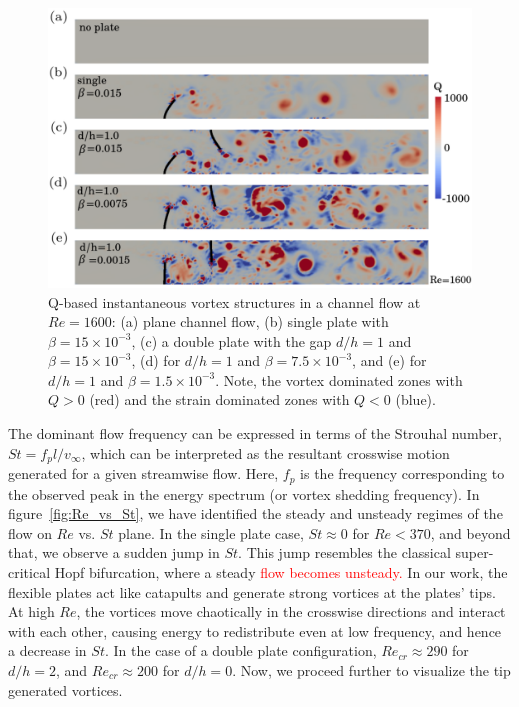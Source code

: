 \documentclass[aps,pre,twocolumn,aps,longbibliography]{revtex4-1}
\begin{document}
	\begin{figure}[b]
		\begin{minipage}[c]{1\linewidth}
			\includegraphics[width=1\linewidth]{Fig14.pdf} 
		\end{minipage} 
		\caption{Q-based instantaneous vortex structures in a channel flow at $Re=1600$: (a) plane channel flow, (b) single plate with $\beta=15\times10^{-3}$, (c) a double plate with the gap $d/h=1$ and $\beta=15\times10^{-3}$, (d) for $d/h=1$ and $\beta=7.5\times10^{-3}$, and (e) for $d/h=1$ and $\beta=1.5\times10^{-3}$. Note, the vortex dominated zones with $Q>0$ (red) and the strain dominated zones with $Q<0$ (blue). }
		\label{fig:Re1600_Qvort}
	\end{figure}
	
	
	The dominant flow frequency can be expressed in terms of the Strouhal number, $St=f_p l/v_{\infty}$, which can be interpreted as the resultant crosswise motion generated for a given streamwise flow. Here, $f_p$ is the frequency corresponding to the observed peak in the energy spectrum (or vortex shedding frequency). In figure~\ref{fig:Re_vs_St}, we have identified the steady and unsteady regimes of the flow on $Re$ vs. $St$ plane. In the single plate case, $St\approx 0$ for $Re<370$, and beyond that, we observe a sudden jump in $St$. This jump resembles the classical super-critical Hopf bifurcation, where a steady \textcolor{red}{flow becomes unsteady.} In our work, the flexible plates act like catapults and generate strong vortices at the plates' tips. At high $Re$, the vortices move chaotically in the crosswise directions and interact with each other, causing energy to redistribute even at low frequency, and hence a decrease in $St$. In the case of a double plate configuration, $Re_{cr}\approx 290$ for $d/h=2$, and $Re_{cr}\approx 200$ for $d/h=0$. Now, we proceed further to visualize the tip generated vortices. 
	
\end{document}
